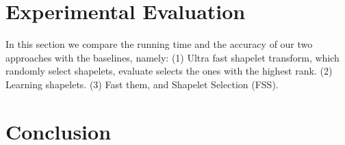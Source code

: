 \documentclass[sigconf, nonacm]{acmart}
\begin{document}
\section{Experimental Evaluation}
In this section we compare the running time and the accuracy of our two
approaches with the baselines, namely:
(1) Ultra fast shapelet transform, which randomly select shapelets, evaluate
selects the ones with the highest rank. (2) Learning shapelets. (3) Fast them,
and Shapelet Selection (FSS).


\section{Conclusion}




\end{document}
